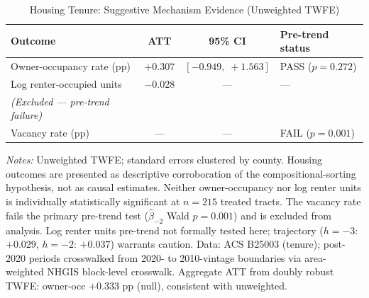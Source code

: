 \documentclass[12pt]{article}
\begin{document}
\begin{table}[ht]
\centering
\caption{Housing Tenure: Suggestive Mechanism Evidence (Unweighted TWFE)}
\label{tab:housing}
\small
\begin{tabular}{lccl}
\toprule
Outcome & ATT & 95\% CI & Pre-trend status \\
\midrule
Owner-occupancy rate (pp) & $+0.307$ & $[-0.949,\; +1.563]$ & PASS ($p = 0.272$) \\
Log renter-occupied units & $-0.028$ & --- & --- \\
\midrule
\textit{(Excluded --- pre-trend failure)} & & & \\
Vacancy rate (pp) & --- & --- & FAIL ($p = 0.001$) \\
\bottomrule
\end{tabular}
\medskip

\noindent\footnotesize
\textit{Notes:} Unweighted TWFE; standard errors clustered by county.
Housing outcomes are presented as descriptive corroboration of the
compositional-sorting hypothesis, not as causal estimates.
Neither owner-occupancy nor log renter units is individually
statistically significant at $n = 215$ treated tracts.
The vacancy rate fails the primary pre-trend test
($\hat{\beta}_{-2}$ Wald $p = 0.001$) and is excluded from analysis.
Log renter units pre-trend not formally tested here;
trajectory ($h = -3$: $+0.029$, $h = -2$: $+0.037$) warrants caution.
Data: ACS B25003 (tenure); post-2020 periods crosswalked from 2020- to
2010-vintage boundaries via area-weighted NHGIS block-level crosswalk.
Aggregate ATT from doubly robust TWFE: owner-occ $+0.333$ pp (null),
consistent with unweighted.
\end{table}
\end{document}
